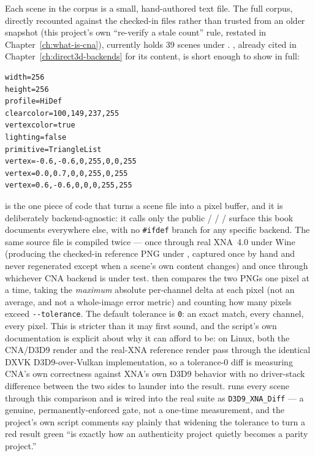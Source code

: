 Each scene in the corpus is a small, hand-authored text file. The full corpus, directly recounted
against the checked-in files rather than trusted from an older snapshot (this project's own
``re-verify a stale count'' rule, restated in Chapter~\ref{ch:what-is-cna}), currently holds
39 scenes under . , already cited in
Chapter~\ref{ch:direct3d-backends} for its  content, is short enough to
show in full:

\begin{lstlisting}[style=cnashell]
width=256
height=256
profile=HiDef
clearcolor=100,149,237,255
vertexcolor=true
lighting=false
primitive=TriangleList
vertex=-0.6,-0.6,0,255,0,0,255
vertex=0.0,0.7,0,0,255,0,255
vertex=0.6,-0.6,0,0,0,255,255
\end{lstlisting}

 is the one piece of code that turns a scene file
into a pixel buffer, and it is deliberately backend-agnostic: it calls only the public
 /  /  / 
surface this book documents everywhere else, with no \verb|#ifdef| branch for any specific
backend. The same source file is compiled twice --- once through real XNA~4.0 under Wine
(producing the checked-in reference PNG under , captured
once by hand and never regenerated except when a scene's own content changes) and once through
whichever CNA backend is under test.  then compares the two PNGs
one pixel at a time, taking the \emph{maximum} absolute per-channel delta at each pixel (not an
average, and not a whole-image error metric) and counting how many pixels exceed
\texttt{{-}{-}tolerance}. The default tolerance is \texttt{0}: an exact match, every channel, every
pixel. This is stricter than it may first sound, and the script's own documentation is explicit
about why it can afford to be: on Linux, both the CNA/D3D9 render and the real-XNA reference
render pass through the identical DXVK D3D9-over-Vulkan implementation, so a tolerance-0 diff is
measuring CNA's own correctness against XNA's own D3D9 behavior with no driver-stack difference
between the two sides to launder into the result. 
runs every scene through this comparison and is wired into the real  suite as
\texttt{D3D9\_XNA\_Diff} --- a genuine, permanently-enforced gate, not a one-time measurement, and
the project's own script comments say plainly that widening the tolerance to turn a red result
green ``is exactly how an authenticity project quietly becomes a parity project.''

